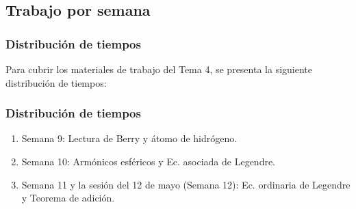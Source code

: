 \documentclass[12pt]{beamer}
\begin{document}
\subsection{Trabajo por semana}

\begin{frame}
\frametitle{Distribución de tiempos}
Para cubrir los materiales de trabajo del Tema 4, se presenta la siguiente distribución de tiempos:
\end{frame}
\begin{frame}
\frametitle{Distribución de tiempos}
\begin{enumerate}[<+->]
\item Semana 9: Lectura de Berry y átomo de hidrógeno.
\item Semana 10: Armónicos esféricos y Ec. asociada de Legendre.
\item Semana 11 y la sesión del 12 de mayo (Semana 12): Ec. ordinaria de Legendre y Teorema de adición.
\end{enumerate}
\end{frame}
\end{document}

